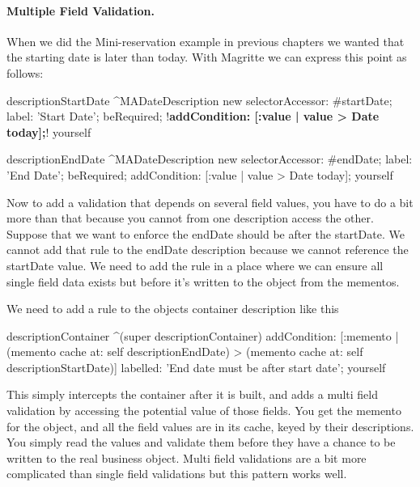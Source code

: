 \documentclass[a4paper,10pt,twoside]{book}
\begin{document}
\paragraph{Multiple Field Validation.}
When we did the Mini-reservation example in previous chapters we wanted that the starting date is 
later than today. With Magritte we can express this point as follows: 

\begin{code}{}
descriptionStartDate
    ^MADateDescription new 
        selectorAccessor: #startDate;
        label: 'Start Date';
        beRequired;
        !\textbf{addCondition: [:value | value > Date today];}!
        yourself

descriptionEndDate
    ^MADateDescription new 
        selectorAccessor: #endDate;
        label: 'End Date';
        beRequired;
        addCondition: [:value | value > Date today];
        yourself
\end{code}

Now to add a validation that depends on several field values, you have to do a bit more than that because
you cannot from one description access the other. 
Suppose that we want to enforce the endDate should be after the startDate. We cannot add that rule to the 
endDate description because we cannot reference the startDate value. We need to add the rule in a place 
where we can ensure all single field data exists but before it's written to the object from the mementos.

We need to add a rule to the objects container description like this

\begin{code}{}
descriptionContainer 
   ^(super descriptionContainer)
        addCondition: [:memento |
            (memento cache at: self descriptionEndDate) > 
               (memento cache at: self descriptionStartDate)]
        labelled: 'End date must be after start date';
        yourself
\end{code}

This simply intercepts the container after it is built, and adds a multi field validation by accessing the 
potential value of those fields. You get the memento for the object, and all the field values are in 
its cache, keyed by their descriptions. You simply read the values and validate them before they have a 
chance to be written to the real business object. Multi field validations are a bit more complicated than 
single field validations but this pattern works well.
\end{document}
